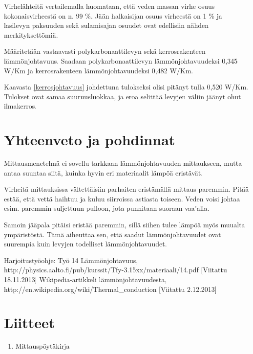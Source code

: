 \documentclass[a4paper,11pt]{article}
\begin{document}
Virhelähteitä vertailemalla huomataan, että veden massan virhe osuus kokonaisvirheestä on n. 99 \%. Jään halkaisijan osuus virheestä on 1 \% ja lasilevyn paksuuden sekä sulamisajan osuudet ovat edellisiin nähden merkityksettömiä. 
   
Määritetään vastaavasti polykarbonaattilevyn sekä kerrosrakenteen lämmönjohtavuus. Saadaan polykarbonaattilevyn lämmönjohtavuudeksi 0,345 W/Km ja kerrosrakenteen lämmönjohtavuudeksi 0,482 W/Km. 

Kaavasta \ref{kerrosjohtavuus} johdettuna tulokseksi olisi pitänyt tulla 0,520 W/Km. Tulokset ovat samaa suuruusluokkaa, ja eroa selittää levyjen väliin jäänyt ohut ilmakerros. 

\section{Yhteenveto ja pohdinnat}

Mittausmenetelmä ei sovellu tarkkaan lämmönjohtavuuden mittaukseen, mutta antaa suuntaa siitä, kuinka hyvin eri materiaalit lämpöä eristävät. 

Virheitä mittauksissa vältettäisiin parhaiten eristämällä mittaus paremmin. Pitää estää, että vettä haihtuu ja kuluu siirroissa astiasta toiseen. Veden voisi johtaa esim. paremmin suljettuun pulloon, jota punnitaan suoraan vaa'alla. 

Samoin jääpala pitäisi eristää paremmin, sillä siihen tulee lämpöä myös muualta ympäristöstä. Tämä aiheuttaa sen, että saadut lämmönjohtavuudet ovat suurempia kuin levyjen todelliset lämmönjohtavuudet. 

\begin{thebibliography}{99}

 Harjoitustyöohje: Työ 14 Lämmönjohtavuus, http://physics.aalto.fi/pub/kurssit/Tfy-3.15xx/materiaali/14.pdf [Viitattu 18.11.2013]
 Wikipedia-artikkeli lämmönjohtavuudesta, http://en.wikipedia.org/wiki/Thermal\_conduction [Viitattu 2.12.2013]

\end{thebibliography}

\section*{Liitteet}
\begin{enumerate}
\item{Mittauspöytäkirja}\label{mittaus}

\end{enumerate}
\end{document}
